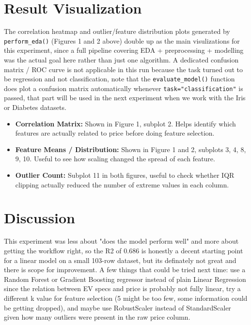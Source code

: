 \documentclass[12pt,a4paper]{article}
\begin{document}
\section{Result Visualization}

The correlation heatmap and outlier/feature distribution plots generated by \texttt{perform\_eda()} (Figures 1 and 2 above) double up as the main visulizations for this experiment, since a full pipeline covering EDA + preprocessing + modelling was the actual goal here rather than just one algorithm. A dedicated confusion matrix / ROC curve is not applicable in this run because the task turned out to be regression and not classification, note that the \texttt{evaluate\_model()} function does plot a confusion matrix automatically whenever \texttt{task="classification"} is passed, that part will be used in the next experiment when we work with the Iris or Diabetes datasets.

\begin{itemize}
\item \textbf{Correlation Matrix:} Shown in Figure 1, subplot 2. Helps identify which features are actually related to price before doing feature selection.
\item \textbf{Feature Means / Distribution:} Shown in Figure 1 and 2, subplots 3, 4, 8, 9, 10. Useful to see how scaling changed the spread of each feature.
\item \textbf{Outlier Count:} Subplot 11 in both figures, useful to check whether IQR clipping actually reduced the number of extreme values in each column.
\end{itemize}

\section{Discussion}
This experiment was less about "does the model perform well" and more about getting the workflow right, so the R2 of 0.686 is honestly a decent starting point for a linear model on a small 103-row dataset, but its definately not great and there is scope for improvement. A few things that could be tried next time: use a Random Forest or Gradient Boosting regressor instead of plain Linear Regression since the relation between EV specs and price is probably not fully linear, try a different k value for feature selection (5 might be too few, some information could be getting dropped), and maybe use RobustScaler instead of StandardScaler given how many outliers were present in the raw price column.
\end{document}
